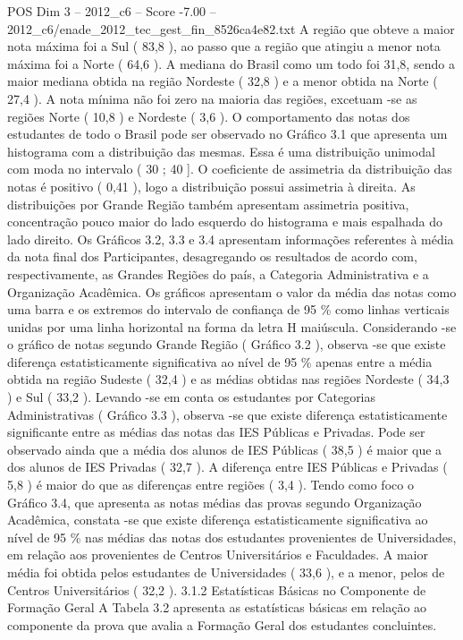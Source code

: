 \begin{textsample}{POS Dim 3 – 2012\_c6 – Score -7.00 – 2012\_c6/enade\_2012\_tec\_gest\_fin\_8526ca4e82.txt}
A região que obteve a maior nota máxima foi a Sul ( 83,8 ), ao passo que a região que atingiu a menor nota máxima foi a Norte ( 64,6 ).
A mediana do Brasil como um todo foi 31,8, sendo a maior mediana obtida na região Nordeste ( 32,8 ) e a menor obtida na Norte ( 27,4 ).
A nota mínima não foi zero na maioria das regiões, excetuam -se as regiões Norte ( 10,8 ) e Nordeste ( 3,6 ).
O comportamento das notas dos estudantes de todo o Brasil pode ser observado no Gráfico 3.1 que apresenta um histograma com a distribuição das mesmas.
Essa é uma distribuição unimodal com moda no intervalo ( 30 ; 40 ].
O coeficiente de assimetria da distribuição das notas é positivo ( 0,41 ), logo a distribuição possui assimetria à direita.
As distribuições por Grande Região também apresentam assimetria positiva, concentração pouco maior do lado esquerdo do histograma e mais espalhada do lado direito.
Os Gráficos 3.2, 3.3 e 3.4 apresentam informações referentes à média da nota final dos Participantes, desagregando os resultados de acordo com, respectivamente, as Grandes Regiões do país, a Categoria Administrativa e a Organização Acadêmica.
Os gráficos apresentam o valor da média das notas como uma barra e os extremos do intervalo de confiança de 95 \% como linhas verticais unidas por uma linha horizontal na forma da letra H maiúscula.
Considerando -se o gráfico de notas segundo Grande Região ( Gráfico 3.2 ), observa -se que existe diferença estatisticamente significativa ao nível de 95 \% apenas entre a média obtida na região Sudeste ( 32,4 ) e as médias obtidas nas regiões Nordeste ( 34,3 ) e Sul ( 33,2 ).
Levando -se em conta os estudantes por Categorias Administrativas ( Gráfico 3.3 ), observa -se que existe diferença estatisticamente significante entre as médias das notas das IES Públicas e Privadas.
Pode ser observado ainda que a média dos alunos de IES Públicas ( 38,5 ) é maior que a dos alunos de IES Privadas ( 32,7 ).
A diferença entre IES Públicas e Privadas ( 5,8 ) é maior do que as diferenças entre regiões ( 3,4 ).
Tendo como foco o Gráfico 3.4, que apresenta as notas médias das provas segundo Organização Acadêmica, constata -se que existe diferença estatisticamente significativa ao nível de 95 \% nas médias das notas dos estudantes provenientes de Universidades, em relação aos provenientes de Centros Universitários e Faculdades.
A maior média foi obtida pelos estudantes de Universidades ( 33,6 ), e a menor, pelos de Centros Universitários ( 32,2 ). 3.1.2 Estatísticas Básicas no Componente de Formação Geral A Tabela 3.2 apresenta as estatísticas básicas em relação ao componente da prova que avalia a Formação Geral dos estudantes concluintes.

\end{textsample}
